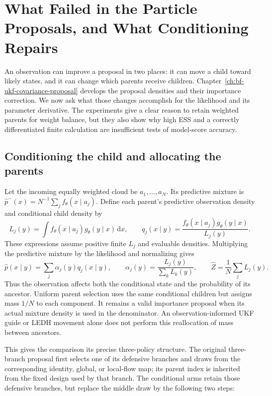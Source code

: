 \chapter{What Failed in the Particle Proposals, and What Conditioning Repairs}
\label{ch:bf-dpf-observation-parent-failures}

An observation can improve a proposal in two places: it can move a child
toward likely states, and it can change which parents receive children.
Chapter~\ref{ch:bf-ukf-covariance-proposal} develops the proposal densities
and their importance correction. We now ask what those changes accomplish
for the likelihood and its parameter derivative. The experiments give a
clear reason to retain weighted parents for weight balance, but they also
show why high ESS and a correctly differentiated finite calculation are
insufficient tests of model-score accuracy.

\section{Conditioning the child and allocating the parents}
Let the incoming equally weighted cloud be $a_1,\ldots,a_N$. Its predictive
mixture is $\widehat p^-(x)=N^{-1}\sum_j f_\theta(x\mid a_j)$. Define each
parent's predictive observation density and conditional child density by
\begin{equation}
 L_j(y)=\int f_\theta(x\mid a_j)g_\theta(y\mid x)\,\mathrm dx,
 \qquad
 q_j(x\mid y)=\frac{f_\theta(x\mid a_j)g_\theta(y\mid x)}{L_j(y)}.
\end{equation}
These expressions assume positive finite $L_j$ and evaluable densities.
Multiplying the predictive mixture by the likelihood and normalizing gives
\begin{equation}
 \widehat p(x\mid y)=\sum_j\alpha_j(y)q_j(x\mid y),
 \qquad \alpha_j(y)=\frac{L_j(y)}{\sum_k L_k(y)},
 \qquad \widehat Z=\frac1N\sum_jL_j(y).
\label{eq:parent-finite-mixture-conditioning}
\end{equation}
Thus the observation affects both the conditional state and the probability
of its ancestor. Uniform parent selection uses the same conditional children
but assigns mass $1/N$ to each component. It remains a valid importance
proposal when its actual mixture density is used in the denominator.
An observation-informed UKF guide or LEDH movement alone does not perform
this reallocation of mass between ancestors.

This gives the comparison its precise three-policy structure. The original
 three-branch proposal first selects one of its defensive branches and draws
 from the corresponding identity, global, or local-flow map; its parent index
 is inherited from the fixed design used by that branch. The conditional arms retain
those defensive branches, but replace the middle draw by the following two
steps:

